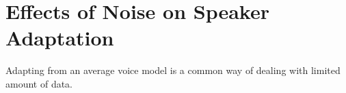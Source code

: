 \section{Effects of Noise on Speaker Adaptation}
\label{noise_speaker_adaptation}
Adapting from an average voice model is a common way of dealing with limited amount of data.
%
